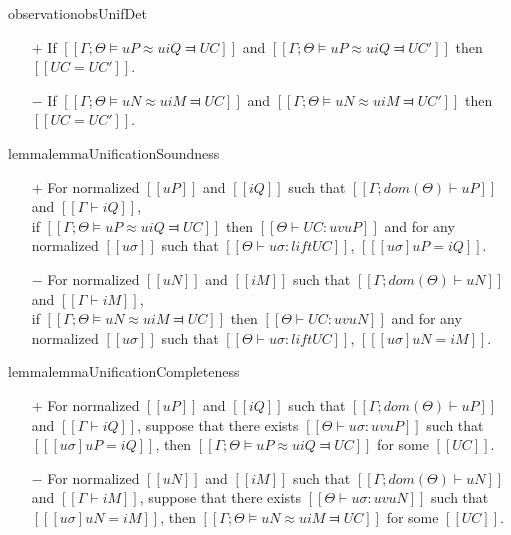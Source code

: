 \begin{restatable}{observation}{obsUnifDet}
    \label{obs:unif-deterministic}
    \hfill
    \begin{itemize}
        \item [$+$] If $[[Γ ; Θ ⊨ uP ≈u iQ ⫤ UC]]$
            and $[[Γ ; Θ ⊨ uP ≈u iQ ⫤ UC']]$ then $[[UC = UC']]$.
        \item [$-$] If $[[Γ ; Θ ⊨ uN ≈u iM ⫤ UC]]$
            and $[[Γ ; Θ ⊨ uN ≈u iM ⫤ UC']]$ then $[[UC = UC']]$.
    \end{itemize}
\end{restatable}

\begin{restatable}{lemma}{lemmaUnificationSoundness}
    \label{lemma:unification-soundness}
    \hfill
    \begin{itemize}
        \item [$+$] For normalized $[[uP]]$ and $[[iQ]]$ such that 
        $[[Γ ; dom(Θ) ⊢ uP]]$ and $[[Γ ⊢ iQ]]$,\\ 
        if $[[Γ ; Θ ⊨ uP ≈u iQ ⫤ UC]]$ then 
        $[[Θ ⊢ UC : uv uP]]$ and for any normalized $[[uσ]]$ 
        such that $[[ Θ ⊢ uσ : lift UC ]]$, $[[ [uσ]uP = iQ ]]$.

        \item [$-$] For normalized $[[uN]]$ and $[[iM]]$ such that
        $[[Γ ; dom(Θ) ⊢ uN]]$ and $[[Γ ⊢ iM]]$,\\
        if $[[Γ ; Θ ⊨ uN ≈u iM ⫤ UC]]$ then 
        $[[Θ ⊢ UC : uv uN]]$ and for any normalized $[[uσ]]$ such that
        $[[ Θ   ⊢ uσ : lift UC ]]$, $[[ [uσ]uN = iM ]]$.
    \end{itemize}
\end{restatable}

\begin{restatable}{lemma}{lemmaUnificationCompleteness}
    \label{lemma:unification-completeness}
    \hfill
    \begin{itemize}
        \item [$+$] For normalized $[[uP]]$ and $[[iQ]]$ such that
        $[[Γ ; dom(Θ) ⊢ uP]]$ and $[[Γ ⊢ iQ]]$, 
        suppose that there exists $[[Θ ⊢ uσ : uv uP]]$ such that $[[ [uσ]uP = iQ ]]$,
        then $[[Γ ; Θ ⊨ uP ≈u iQ ⫤ UC]]$ for some $[[UC]]$.
        
        \item [$-$] For normalized $[[uN]]$ and $[[iM]]$ such that
        $[[Γ ; dom(Θ) ⊢  uN]]$ and $[[Γ ⊢ iM]]$,
        suppose that there exists $[[Θ ⊢ uσ : uv uN]]$ such that $[[ [uσ]uN = iM ]]$,
        then $[[Γ ; Θ ⊨ uN ≈u iM ⫤ UC]]$ for some $[[UC]]$.
   \end{itemize}
\end{restatable}
